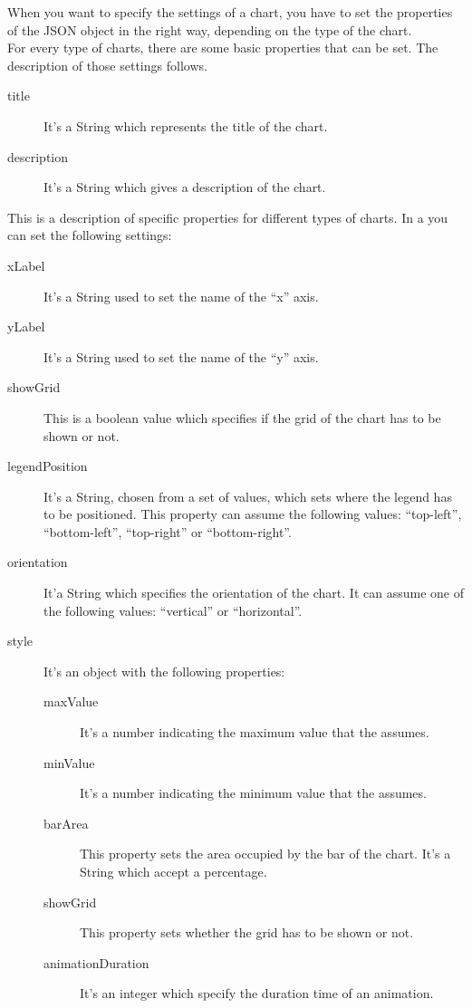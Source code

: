 			When you want to specify the settings of a chart, you have to set the properties of the JSON object in the right way, depending on the type of the chart.\\
			For every type of charts, there are some basic properties that can be set. The description of those settings follows.
			\begin{description}
				\item[title] It's a String which represents the title of the chart.
				\item[description] It's a String which gives a description of the chart.
			\end{description}
			This is a description of specific properties for different types of charts.
				In a  you can set the following settings:
				\begin{description}
					\item[xLabel] It's a String used to set the name of the “x” axis.
					\item[yLabel] It's a String used to set the name of the “y” axis.
					\item[showGrid] This is a boolean value which specifies if the grid of the chart has to be shown or not.
					\item[legendPosition] It's a String, chosen from a set of values, which sets where the legend has to be positioned. This property can assume the following values: “top-left”, “bottom-left”, “top-right” or “bottom-right”.
					\item[orientation] It'a String which specifies the orientation of the chart. It can assume one of the following values: “vertical” or “horizontal”.
					\item[style] It's an object with the following properties:
					\begin{description}
						\item[maxValue] It's a number indicating the maximum value that the  assumes.
						\item[minValue] It's a number indicating the minimum value that the  assumes.
						\item[barArea] This property sets the area occupied by the bar of the chart. It's a String which accept a percentage.
						\item[showGrid] This property sets whether the grid has to be shown or not.
						\item[animationDuration] It's an integer which specify the duration time of an animation.
					\end{description}
				\end{description}
